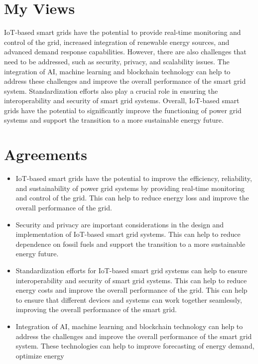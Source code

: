 \documentclass{article}
\begin{document}
\section{My Views}
IoT-based smart grids have the potential to provide real-time monitoring and control of the grid, increased integration of renewable energy sources, and advanced demand response capabilities. However, there are also challenges that need to be addressed, such as security, privacy, and scalability issues. The integration of AI, machine learning and blockchain technology can help to address these challenges and improve the overall performance of the smart grid system. Standardization efforts also play a crucial role in ensuring the interoperability and security of smart grid systems. Overall, IoT-based smart grids have the potential to significantly improve the functioning of power grid systems and support the transition to a more sustainable energy future.

\section{Agreements}
\begin{itemize}

\item IoT-based smart grids have the potential to improve the efficiency, reliability, and sustainability of power grid systems by providing real-time monitoring and control of the grid. This can help to reduce energy loss and improve the overall performance of the grid.

\item Security and privacy are important considerations in the design and implementation of IoT-based smart grid systems. This can help to reduce dependence on fossil fuels and support the transition to a more sustainable energy future.

\item Standardization efforts for IoT-based smart grid systems can help to ensure interoperability and security of smart grid systems. This can help to reduce energy costs and improve the overall performance of the grid. This can help to ensure that different devices and systems can work together seamlessly, improving the overall performance of the smart grid.

\item Integration of AI, machine learning and blockchain technology can help to address the challenges and improve the overall performance of the smart grid system. These technologies can help to improve forecasting of energy demand, optimize energy 

\end{itemize}
\end{document}

